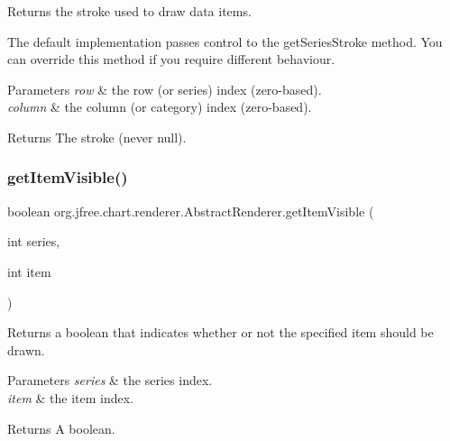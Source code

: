 Returns the stroke used to draw data items. 

The default implementation passes control to the get\+Series\+Stroke method. You can override this method if you require different behaviour.


\begin{DoxyParams}{Parameters}
{\em row} & the row (or series) index (zero-\/based). \\
\hline
{\em column} & the column (or category) index (zero-\/based).\\
\hline
\end{DoxyParams}
\begin{DoxyReturn}{Returns}
The stroke (never {\ttfamily null}). 
\end{DoxyReturn}
\mbox{\label{classorg_1_1jfree_1_1chart_1_1renderer_1_1_abstract_renderer_a28b63ce0af9ca244a38261f381c0d971}} 
\subsubsection{\texorpdfstring{get\+Item\+Visible()}{getItemVisible()}}
{\footnotesize\ttfamily boolean org.\+jfree.\+chart.\+renderer.\+Abstract\+Renderer.\+get\+Item\+Visible (\begin{DoxyParamCaption}\item[{int}]{series,  }\item[{int}]{item }\end{DoxyParamCaption})}

Returns a boolean that indicates whether or not the specified item should be drawn.


\begin{DoxyParams}{Parameters}
{\em series} & the series index. \\
\hline
{\em item} & the item index.\\
\hline
\end{DoxyParams}
\begin{DoxyReturn}{Returns}
A boolean. 
\end{DoxyReturn}
\mbox{\label{classorg_1_1jfree_1_1chart_1_1renderer_1_1_abstract_renderer_a89b83430ef7148f8e08c2e03bd3a65d9}} 
